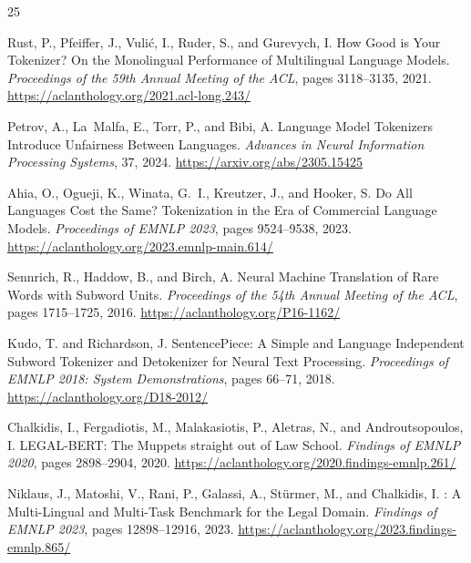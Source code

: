 \documentclass[11pt,a4paper]{article}
\begin{document}
\begin{thebibliography}{25}
\providecommand{\natexlab}[1]{#1}

Rust, P., Pfeiffer, J., Vuli\'{c}, I., Ruder, S., and Gurevych, I.
\newblock How Good is Your Tokenizer? On the Monolingual Performance of Multilingual Language Models.
\newblock \emph{Proceedings of the 59th Annual Meeting of the ACL}, pages 3118--3135, 2021.
\newblock \url{https://aclanthology.org/2021.acl-long.243/}

Petrov, A., La~Malfa, E., Torr, P., and Bibi, A.
\newblock Language Model Tokenizers Introduce Unfairness Between Languages.
\newblock \emph{Advances in Neural Information Processing Systems}, 37, 2024.
\newblock \url{https://arxiv.org/abs/2305.15425}

Ahia, O., Ogueji, K., Winata, G.~I., Kreutzer, J., and Hooker, S.
\newblock Do All Languages Cost the Same? Tokenization in the Era of Commercial Language Models.
\newblock \emph{Proceedings of EMNLP 2023}, pages 9524--9538, 2023.
\newblock \url{https://aclanthology.org/2023.emnlp-main.614/}

Sennrich, R., Haddow, B., and Birch, A.
\newblock Neural Machine Translation of Rare Words with Subword Units.
\newblock \emph{Proceedings of the 54th Annual Meeting of the ACL}, pages 1715--1725, 2016.
\newblock \url{https://aclanthology.org/P16-1162/}

Kudo, T. and Richardson, J.
\newblock SentencePiece: A Simple and Language Independent Subword Tokenizer and Detokenizer for Neural Text Processing.
\newblock \emph{Proceedings of EMNLP 2018: System Demonstrations}, pages 66--71, 2018.
\newblock \url{https://aclanthology.org/D18-2012/}

Chalkidis, I., Fergadiotis, M., Malakasiotis, P., Aletras, N., and Androutsopoulos, I.
\newblock LEGAL-BERT: The Muppets straight out of Law School.
\newblock \emph{Findings of EMNLP 2020}, pages 2898--2904, 2020.
\newblock \url{https://aclanthology.org/2020.findings-emnlp.261/}

Niklaus, J., Matoshi, V., Rani, P., Galassi, A., St{\"u}rmer, M., and Chalkidis, I.
: A Multi-Lingual and Multi-Task Benchmark for the Legal Domain.
\newblock \emph{Findings of EMNLP 2023}, pages 12898--12916, 2023.
\newblock \url{https://aclanthology.org/2023.findings-emnlp.865/}


\end{thebibliography}
\end{document}
